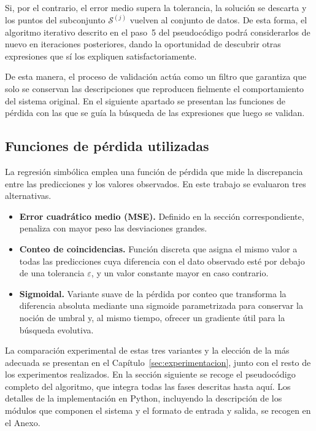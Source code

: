 Si, por el contrario, el error medio supera la tolerancia, la solución se descarta y los puntos del subconjunto \(\mathcal{S}^{(j)}\) vuelven al conjunto de datos. De esta forma, el algoritmo iterativo descrito en el paso~5 del pseudocódigo podrá considerarlos de nuevo en iteraciones posteriores, dando la oportunidad de descubrir otras expresiones que sí los expliquen satisfactoriamente.

De esta manera, el proceso de validación actúa como un filtro que garantiza que solo se conservan las descripciones que reproducen fielmente el comportamiento del sistema original. En el siguiente apartado se presentan las funciones de pérdida con las que se guía la búsqueda de las expresiones que luego se validan.

\subsection{Funciones de pérdida utilizadas} \label{sec:funciones_perdida}

La regresión simbólica emplea una función de pérdida que mide la discrepancia entre las predicciones y los valores observados. En este trabajo se evaluaron tres alternativas.

\begin{itemize} \item \textbf{Error cuadrático medio (MSE).} Definido en la sección correspondiente, penaliza con mayor peso las desviaciones grandes. \item \textbf{Conteo de coincidencias.} Función discreta que asigna el mismo valor a todas las predicciones cuya diferencia con el dato observado esté por debajo de una tolerancia \(\varepsilon\), y un valor constante mayor en caso contrario. \item \textbf{Sigmoidal.} Variante suave de la pérdida por conteo que transforma la diferencia absoluta mediante una sigmoide parametrizada para conservar la noción de umbral y, al mismo tiempo, ofrecer un gradiente útil para la búsqueda evolutiva. \end{itemize}

La comparación experimental de estas tres variantes y la elección de la más adecuada se presentan en el Capítulo~\ref{sec:experimentacion}, junto con el resto de los experimentos realizados. En la sección siguiente se recoge el pseudocódigo completo del algoritmo, que integra todas las fases descritas hasta aquí. Los detalles de la implementación en Python, incluyendo la descripción de los módulos que componen el sistema y el formato de entrada y salida, se recogen en el Anexo.


